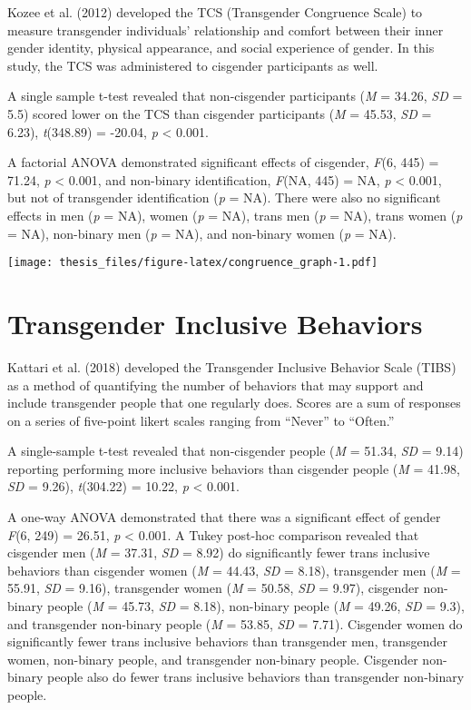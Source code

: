 \documentclass[12pt,twoside]{reedthesis}
\begin{document}
Kozee et al. (2012) developed the TCS (Transgender Congruence Scale) to measure transgender individuals' relationship and comfort between their inner gender identity, physical appearance, and social experience of gender. In this study, the TCS was administered to cisgender participants as well.

A single sample t-test revealed that non-cisgender participants (\emph{M} = 34.26, \emph{SD} = 5.5) scored lower on the TCS than cisgender participants (\emph{M} = 45.53, \emph{SD} = 6.23), \emph{t}(348.89) = -20.04, \emph{p} \textless{} 0.001.

A factorial ANOVA demonstrated significant effects of cisgender, \emph{F}(6, 445) = 71.24, \emph{p} \textless{} 0.001,
and non-binary identification, \emph{F}(NA, 445) = NA, \emph{p} \textless{} 0.001,
but not of transgender identification (\emph{p} = NA).
There were also no significant effects in men (\emph{p} = NA), women (\emph{p} = NA), trans men (\emph{p} = NA), trans women (\emph{p} = NA), non-binary men (\emph{p} = NA), and non-binary women (\emph{p} = NA).

\texttt{[image: thesis\_files/figure-latex/congruence\_graph-1.pdf]}

\hypertarget{transgender-inclusive-behaviors}{%
\section{Transgender Inclusive Behaviors}\label{transgender-inclusive-behaviors}}

Kattari et al. (2018) developed the Transgender Inclusive Behavior Scale (TIBS) as a method of quantifying the number of behaviors that may support and include transgender people that one regularly does. Scores are a sum of responses on a series of five-point likert scales ranging from ``Never'' to ``Often.''

A single-sample t-test revealed that non-cisgender people (\emph{M} = 51.34, \emph{SD} = 9.14) reporting performing more inclusive behaviors than cisgender people (\emph{M} = 41.98, \emph{SD} = 9.26), \emph{t}(304.22) = 10.22, \emph{p} \textless{} 0.001.

A one-way ANOVA demonstrated that there was a significant effect of gender \emph{F}(6, 249) = 26.51, \emph{p} \textless{} 0.001.
A Tukey post-hoc comparison revealed that cisgender men (\emph{M} = 37.31, \emph{SD} = 8.92) do significantly fewer trans inclusive behaviors than cisgender women (\emph{M} = 44.43, \emph{SD} = 8.18), transgender men (\emph{M} = 55.91, \emph{SD} = 9.16), transgender women (\emph{M} = 50.58, \emph{SD} = 9.97), cisgender non-binary people (\emph{M} = 45.73, \emph{SD} = 8.18), non-binary people (\emph{M} = 49.26, \emph{SD} = 9.3), and transgender non-binary people (\emph{M} = 53.85, \emph{SD} = 7.71). Cisgender women do significantly fewer trans inclusive behaviors than transgender men, transgender women, non-binary people, and transgender non-binary people. Cisgender non-binary people also do fewer trans inclusive behaviors than transgender non-binary people.
\end{document}
